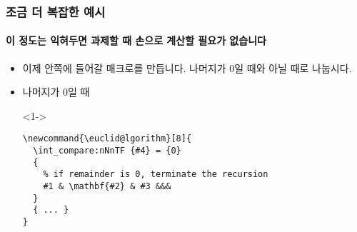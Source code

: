 \begin{frame}[fragile]
  \frametitle{조금 더 복잡한 예시}
  \framesubtitle{이 정도는 익혀두면 과제할 때 손으로 계산할 필요가 없습니다}
  \begin{itemize}
    \item<1-> 이제 안쪽에 들어갈 매크로를 만듭니다. 나머지가 0일 때와 아닐 때로 나눕시다.
    \item<1-> 나머지가 0일 때
    \item[]<1-> \vspace{-1.5em}\begin{verbatim}
\newcommand{\euclid@lgorithm}[8]{
  \int_compare:nNnTF {#4} = {0}
  {
    % if remainder is 0, terminate the recursion
    #1 & \mathbf{#2} & #3 &&&
  }
  { ... }
}
    \end{verbatim}
  \end{itemize}
\end{frame}

